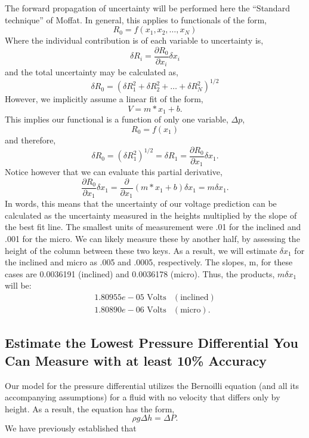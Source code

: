\documentclass{article}
\begin{document}
The forward propagation of uncertainty will be performed here the
``Standard technique'' of Moffat. In general, this applies to
functionals of the form, 
\begin{equation}
  R_0 = f(x_1,x_2, \ldots ,x_N)
\end{equation}
Where the individual contribution is of each variable to uncertainty is,
\begin{equation}
  \delta R_i = \frac{\partial R_0}{\partial x_i} \delta x_i
\end{equation}
and the total uncertainty may be calculated as, 
\begin{equation}
  \delta R_0 = \left(\delta R_1^2 + \delta R_2^2 + \ldots + \delta R_N^2 \right)^{1/2}
\end{equation}
However, we implicitly assume a linear fit of the form, 
\begin{equation}
  V = m*x_1 + b. 
\end{equation}
This implies our functional is a function of only one variable, $\Delta p$, 
\begin{equation}
  R_0 = f(x_1)
\end{equation}
and therefore,
\begin{equation}
  \delta R_0 = \left(\delta R_1^2 \right)^{1/2} = \delta R_1 =
   \frac{\partial R_0}{\partial x_1} \delta x_1.
\end{equation}
 Notice however that we can evaluate this partial derivative, 
\begin{equation}
 \frac{\partial R_0}{\partial x_1} \delta x_1 = \frac{\partial}{\partial
  x_1}\left( m*x_1 +b \right) \delta x_1 = m \delta x_1. 
\end{equation}
In words, this means that the uncertainty of our voltage prediction can
be calculated as the uncertainty measured in the heights multiplied by
the slope of the best fit line. The smallest units of measurement were
.01 for the inclined and .001 for the micro. We can likely measure these
by another half, by assessing the height of the column between these two
keys. As a result, we will estimate $\delta x_1$ for the inclined and
micro as .005 and .0005, respectively. The slopes, m, for these cases
are 0.0036191 (inclined) and 0.0036178 (micro). Thus, the products, $m
\delta x_1$ will be: 
\begin{eqnarray}
1.80955e-05 \text{ Volts} & (\text{inclined}) \\
1.80890e-06 \text{ Volts} & (\text{micro}). 
\end{eqnarray}


\subsection{Estimate the Lowest Pressure Differential You Can Measure
  with at least 10\% Accuracy}

Our model for the pressure differential utilizes the Bernoilli equation
(and all its accompanying assumptions) for a fluid with no velocity that
differs only by height. As a result, the equation has the form,
\begin{equation}
 \rho g \Delta h = \Delta P. 
\end{equation}
We have previously established that 
\end{document}
